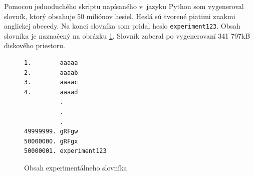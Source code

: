 \documentclass[slovak]{fitthesis}
\begin{document}
Pomocou jednoduchého skriptu napísaného v~jazyku Python som vygeneroval slovník, ktorý obsahuje 50 miliónov hesiel. Heslá sú tvorené piatimi znakmi anglickej abecedy. Na konci slovníka som pridal heslo \texttt{experiment123}. Obsah slovníka je naznačený na obrázku \ref{fig:experimentDict}. Slovník zaberal po vygenerovaní 341 797kB diskového priestoru.
\begin{figure}[h]
\begin{center}
\begin{varwidth}{\linewidth}
\begin{verbatim}
1.        aaaaa
2.        aaaab
3.        aaaac
4.        aaaad
          .
          .
          .
49999999. gRFgw
50000000. gRFgx
50000001. experiment123
\end{verbatim}
\end{varwidth}
\end{center}
\caption{Obsah experimentálneho slovníka}
\label{fig:experimentDict}
\end{figure}
\end{document}
